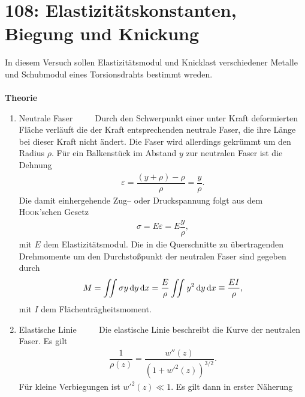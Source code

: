 \newpage
\section{108: Elastizitätskonstanten, Biegung und Knickung}
In diesem Versuch sollen Elastizitätsmodul und Knicklast verschiedener Metalle und Schubmodul eines Torsionsdrahts bestimmt wreden.\\\\
\textbf{Theorie} 
\begin{enumerate}[label=--]
        \item Neutrale Faser $\qquad $ 
                Durch den Schwerpunkt einer unter Kraft deformierten Fläche verläuft die der Kraft entsprechenden neutrale Faser, die ihre Länge bei dieser Kraft nicht ändert.
                Die Faser wird allerdings gekrümmt um den Radius $\rho $. 
                Für ein Balkenstück im Abstand $y$ zur neutralen Faser ist die Dehnung
                \begin{align} 
                        \varepsilon =\dfrac{\left(y+\rho \right)-\rho }{\rho }=\dfrac{y}{\rho }
                .\end{align} 
                Die damit einhergehende Zug-- oder Druckspannung folgt aus dem \textsc{Hook}'schen Gesetz
                \begin{align} 
                        \sigma =E\varepsilon =E\dfrac{y}{\rho }
                ,\end{align} 
                mit $E$ dem Elastizitätsmodul.
                Die in die Querschnitte zu übertragenden Drehmomente um den Durchstoßpunkt der neutralen Faser sind gegeben durch
                \begin{align} 
                        M=\iint\sigma y\,\text{d} y\,\text{d} x=\dfrac{E}{\rho }\iint_{}^{}y^2\,\text{d} y\,\text{d} x\equiv \dfrac{EI}{\rho }
                ,\end{align} 
                mit $I$ dem Flächenträgheitsmoment.
        \item Elastische Linie $\qquad $ 
                Die elastische Linie beschreibt die Kurve der neutralen Faser. 
                Es gilt
                \begin{align} 
                        \dfrac{1}{\rho \left(z\right)}=\dfrac{w''\left(z\right)}{\left(1+w'^2\left(z\right)\right)^{3/2}}
                .\end{align} 
                Für kleine Verbiegungen ist $w'^2\left(z\right)\ll 1$. 
                Es gilt dann in erster Näherung
                \begin{align} 

\end{align}
\end{enumerate}
